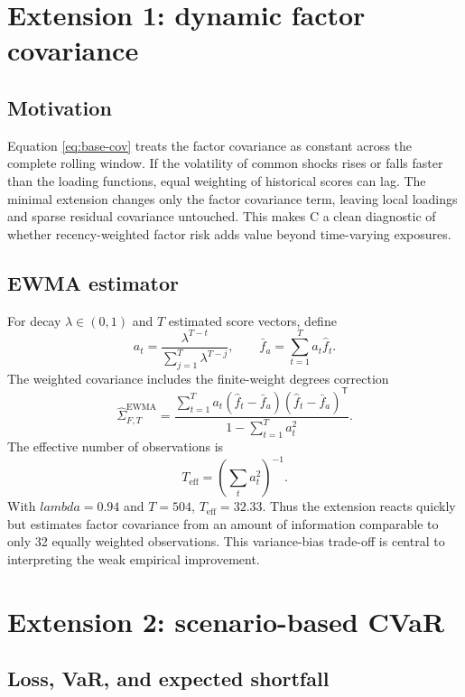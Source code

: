 \documentclass[11pt,a4paper]{article}
\newcommand{\wh}{\widehat}
\newcommand{\trans}{^{\mathsf T}}
\begin{document}
\section{Extension 1: dynamic factor covariance}

\subsection{Motivation}

Equation \eqref{eq:base-cov} treats the factor covariance as constant across the complete rolling window. If the volatility of common shocks rises or falls faster than the loading functions, equal weighting of historical scores can lag. The minimal extension changes only the factor covariance term, leaving local loadings and sparse residual covariance untouched. This makes C a clean diagnostic of whether recency-weighted factor risk adds value beyond time-varying exposures.

\subsection{EWMA estimator}

For decay $\lambda\in(0,1)$ and $T$ estimated score vectors, define
\begin{equation}
 a_t=\frac{\lambda^{T-t}}{\sum_{j=1}^T\lambda^{T-j}},
 \qquad \bar f_a=\sum_{t=1}^T a_t\wh f_t.
\end{equation}
The weighted covariance includes the finite-weight degrees correction
\begin{equation}
 \wh\Sigma_{F,T}^{\text{EWMA}}
 =\frac{\sum_{t=1}^Ta_t(\wh f_t-\bar f_a)(\wh f_t-\bar f_a)\trans}
 {1-\sum_{t=1}^Ta_t^2}.
 \label{eq:ewma}
\end{equation}
The effective number of observations is
\begin{equation}
 T_{\text{eff}}=\left(\sum_ta_t^2\right)^{-1}.
\end{equation}
With $lambda=0.94$ and $T=504$, $T_{\text{eff}}=32.33$. Thus the extension reacts quickly but estimates factor covariance from an amount of information comparable to only 32 equally weighted observations. This variance-bias trade-off is central to interpreting the weak empirical improvement.

\section{Extension 2: scenario-based CVaR}

\subsection{Loss, VaR, and expected shortfall}
\end{document}
